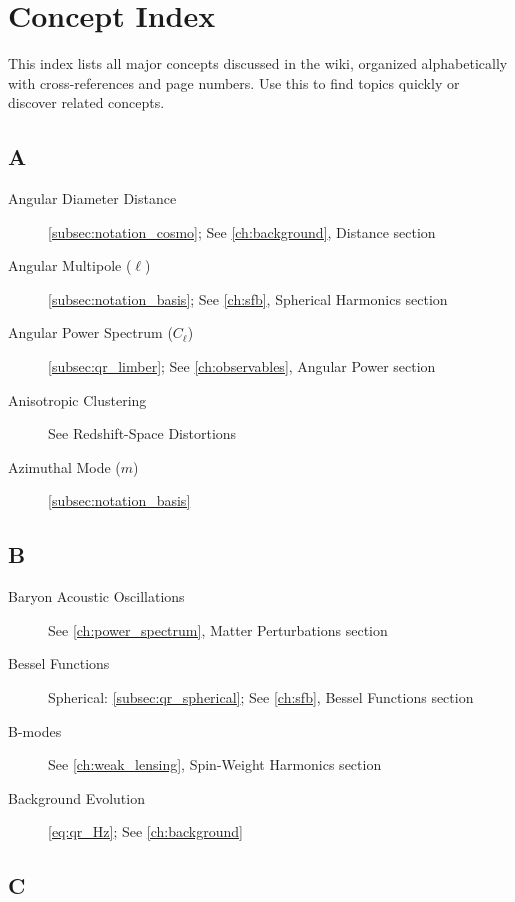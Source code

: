 \section{Concept Index}\label{sec:concept_index}

This index lists all major concepts discussed in the wiki, organized alphabetically with cross-references and page numbers. Use this to find topics quickly or discover related concepts.

\subsection{A}\label{subsec:idx_a}

\begin{description}
    \item[Angular Diameter Distance] \autoref{subsec:notation_cosmo}; See \cref{ch:background}, Distance section
    \item[Angular Multipole ($\ell$)] \autoref{subsec:notation_basis}; See \cref{ch:sfb}, Spherical Harmonics section
    \item[Angular Power Spectrum ($C_\ell$)] \autoref{subsec:qr_limber}; See \cref{ch:observables}, Angular Power section
    \item[Anisotropic Clustering] See Redshift-Space Distortions
    \item[Azimuthal Mode ($m$)] \autoref{subsec:notation_basis}
\end{description}

\subsection{B}\label{subsec:idx_b}

\begin{description}
    \item[Baryon Acoustic Oscillations] See \cref{ch:power_spectrum}, Matter Perturbations section
    \item[Bessel Functions] Spherical: \autoref{subsec:qr_spherical}; See \cref{ch:sfb}, Bessel Functions section
    \item[B-modes] See \cref{ch:weak_lensing}, Spin-Weight Harmonics section
    \item[Background Evolution] \autoref{eq:qr_Hz}; See \cref{ch:background}
\end{description}

\subsection{C}\label{subsec:idx_c}

